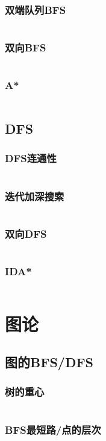 \documentclass[a4paper,12pt]{article}
\begin{document}
\subsubsection{双端队列BFS}
\inputminted[breaklines, linenos]{c++}{search/bfs/deq_bfs.cc}
\subsubsection{双向BFS}
\inputminted[breaklines, linenos]{c++}{search/bfs/2side_bfs.cc}
\subsubsection{A*}
\inputminted[breaklines, linenos]{c++}{search/bfs/astar.cc}
\subsection{DFS}
\subsubsection{DFS连通性}
\inputminted[breaklines, linenos]{c++}{search/dfs/link.cc}
\subsubsection{迭代加深搜索}
\inputminted[breaklines, linenos]{c++}{search/dfs/diedai.cc}
\subsubsection{双向DFS}
\inputminted[breaklines, linenos]{c++}{search/dfs/2side.cc}
\subsubsection{IDA*}
\inputminted[breaklines, linenos]{c++}{search/dfs/ida.cc}


\newpage
\section{图论} %
\subsection{图的BFS/DFS}  %
\subsubsection{树的重心}
\inputminted[breaklines, linenos]{c++}{graph/bdfs/grav.cc}
\subsubsection{BFS最短路/点的层次}
\inputminted[breaklines, linenos]{c++}{graph/bdfs/cenci.cc}
\end{document}
